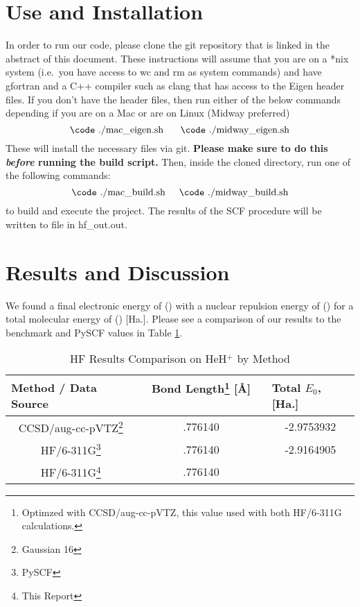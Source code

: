 \documentclass[%
 aip,
 amsmath,amssymb,
 reprint,%
]{revtex4-1}
\begin{document}
\section{Use and Installation}
In order to run our code, please clone the git repository that is linked in
the abstract of this document. These instructions will assume that you are
 on a *nix system (i.e.\ you have access to {\code wc} and {\code rm} as
 system commands) and have {\code gfortran} and a C++ compiler such as 
 {\code clang} that has access to the Eigen header files. If you don't
have the header files,  then run either of the below commands depending if you
are on a Mac or are on Linux (Midway preferred)
$$ \text{{\code ./mac\_eigen.sh} \hspace{0.5cm}{\code ./midway\_eigen.sh}}$$
These will install the necessary files via git.  \textbf{Please make sure to
do this \emph{before} running the build script.} Then, inside the cloned
directory, run one of the following commands: 
%
$$ \text{{\code ./mac\_build.sh}} \hspace{0.5cm}
 \text{{\code ./midway\_build.sh}} $$
to build and execute the project. The results of the SCF procedure will be
 written to file in {\code hf\_out.out}.

\section{Results and Discussion}
We found a final electronic energy of () with a nuclear repulsion energy of
() for a total molecular energy of () [Ha.]. Please see a comparison of our
results to the benchmark and PySCF values in Table \ref{tab:hf_results}.

\begin{table}[]
\caption{HF Results Comparison on HeH$^{+}$ by Method}
\label{tab:hf_results}
\begin{ruledtabular}
\begin{tabular}{|c|c|c|}
\hline
\multicolumn{1}{|l|}{\textbf{Method / Data Source}} &
\multicolumn{1}{c|}{\textbf{Bond Length\footnote{Optimzed with
CCSD/aug-cc-pVTZ, this value used with both HF/6-311G calculations.} [Å] \ \ \ \ }} 
& \multicolumn{1}{l|}{\textbf{Total $E_0$, [Ha.]}} \\ \hline
CCSD/aug-cc-pVTZ\footnote{Gaussian 16}      & .776140  & -2.9753932    \\ \hline 
HF/6-311G\footnote{PySCF}     & .776140     & -2.9164905    \\ \hline
HF/6-311G\footnote{This Report}  & .776140  &          \\ \hline
\end{tabular}
\end{ruledtabular}
\end{table}
\end{document}
